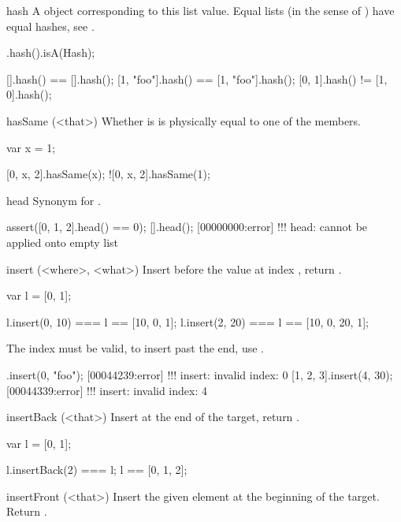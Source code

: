 \begin{urbiscriptapi}
\item[hash] A  object corresponding to this list
  value. Equal lists (in the sense of ) have equal hashes, see
  .

\begin{urbiassert}
[].hash().isA(Hash);

        [].hash() == [].hash();
[1, "foo"].hash() == [1, "foo"].hash();
    [0, 1].hash() != [1, 0].hash();
\end{urbiassert}


\item[hasSame](<that>)%
  Whether \that is is physically equal to one of the members.
\begin{urbiassert}
var x = 1;

 [0, x, 2].hasSame(x);
![0, x, 2].hasSame(1);
\end{urbiassert}


\item[head]
  Synonym for .
\begin{urbiscript}
assert([0, 1, 2].head() == 0);
[].head();
[00000000:error] !!! head: cannot be applied onto empty list
\end{urbiscript}


\item[insert](<where>, <what>)%
  Insert  before the value at index , return
  \this.
\begin{urbiassert}
var l = [0, 1];

l.insert(0, 10) === l == [10, 0, 1];
l.insert(2, 20) === l == [10, 0, 20, 1];
\end{urbiassert}

  The index must be valid, to insert past the end, use .
\begin{urbiscript}
[].insert(0, "foo");
[00044239:error] !!! insert: invalid index: 0
[1, 2, 3].insert(4, 30);
[00044339:error] !!! insert: invalid index: 4
\end{urbiscript}


\item[insertBack](<that>)%
  Insert \that at the end of the target, return \this.

\begin{urbiassert}
var l = [0, 1];

l.insertBack(2) === l;
l == [0, 1, 2];
\end{urbiassert}


\item[insertFront](<that>)%
  Insert the given element at the beginning of the target.  Return \this.


\end{urbiscriptapi}
